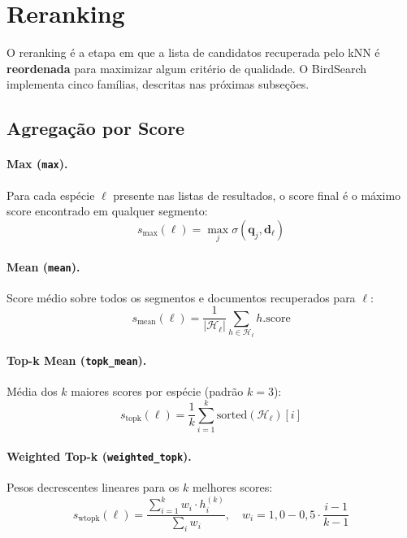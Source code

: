 \documentclass[12pt,a4paper]{article}
\begin{document}
\section{Reranking}
\label{sec:reranking}

O reranking é a etapa em que a lista de candidatos recuperada pelo kNN é
\textbf{reordenada} para maximizar algum critério de qualidade. O BirdSearch
implementa cinco famílias, descritas nas próximas subseções.

\subsection{Agregação por Score}

\paragraph{Max (\texttt{max}).}
Para cada espécie $\ell$ presente nas listas de resultados, o score final é o
máximo score encontrado em qualquer segmento:
\begin{equation}
  s_{\text{max}}(\ell) = \max_{j} \sigma(\mathbf{q}_j, \mathbf{d}_\ell)
  \label{eq:rk_max}
\end{equation}

\paragraph{Mean (\texttt{mean}).}
Score médio sobre todos os segmentos e documentos recuperados para $\ell$:
\begin{equation}
  s_{\text{mean}}(\ell) = \frac{1}{|\mathcal{H}_\ell|}\sum_{h \in \mathcal{H}_\ell} h.\text{score}
  \label{eq:rk_mean}
\end{equation}

\paragraph{Top-k Mean (\texttt{topk\_mean}).}
Média dos $k$ maiores scores por espécie (padrão $k=3$):
\begin{equation}
  s_{\text{topk}}(\ell) = \frac{1}{k}\sum_{i=1}^{k} \text{sorted}(\mathcal{H}_\ell)[i]
  \label{eq:rk_topk}
\end{equation}

\paragraph{Weighted Top-k (\texttt{weighted\_topk}).}
Pesos decrescentes lineares para os $k$ melhores scores:
\begin{equation}
  s_{\text{wtopk}}(\ell) =
  \frac{\sum_{i=1}^{k} w_i \cdot h_i^{(k)}}{\sum_i w_i},
  \quad w_i = 1{,}0 - 0{,}5\cdot\frac{i-1}{k-1}
  \label{eq:rk_wtopk}
\end{equation}
\end{document}
